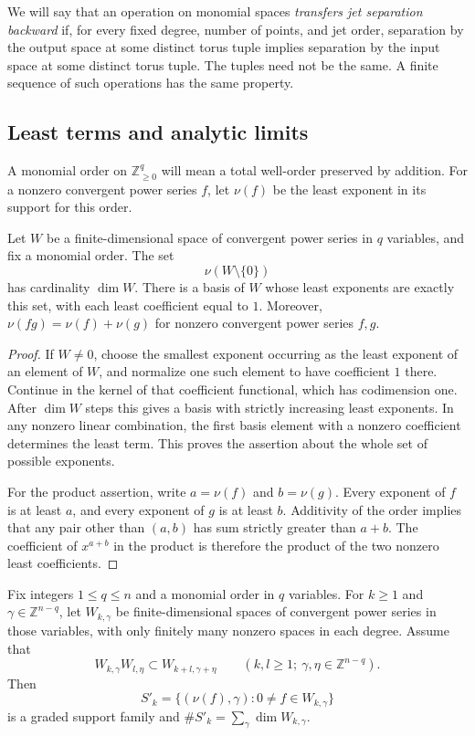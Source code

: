 We will say that an operation on monomial spaces \emph{transfers jet separation backward} if, for every fixed degree, number of points, and jet order, separation by the output space at some distinct torus tuple implies separation by the input space at some distinct torus tuple. The tuples need not be the same. A finite sequence of such operations has the same property.

\subsection{Least terms and analytic limits}

A monomial order on $\mathbb{Z}_{\geq0}^q$ will mean a total well-order preserved by addition. For a nonzero convergent power series $f$, let $\nu(f)$ be the least exponent in its support for this order.

\begin{lemma}\label{lem:least-terms}
Let $W$ be a finite-dimensional space of convergent power series in $q$ variables, and fix a monomial order. The set
\[
 \nu(W\setminus\{0\})
\]
has cardinality $\dim W$. There is a basis of $W$ whose least exponents are exactly this set, with each least coefficient equal to $1$. Moreover, $\nu(fg)=\nu(f)+\nu(g)$ for nonzero convergent power series $f,g$.
\end{lemma}

\begin{proof}
If $W\ne0$, choose the smallest exponent occurring as the least exponent of an element of $W$, and normalize one such element to have coefficient $1$ there. Continue in the kernel of that coefficient functional, which has codimension one. After $\dim W$ steps this gives a basis with strictly increasing least exponents. In any nonzero linear combination, the first basis element with a nonzero coefficient determines the least term. This proves the assertion about the whole set of possible exponents.

For the product assertion, write $a=\nu(f)$ and $b=\nu(g)$. Every exponent of $f$ is at least $a$, and every exponent of $g$ is at least $b$. Additivity of the order implies that any pair other than $(a,b)$ has sum strictly greater than $a+b$. The coefficient of $x^{a+b}$ in the product is therefore the product of the two nonzero least coefficients.
\end{proof}

\begin{lemma}\label{lem:row-valuation}
Fix integers $1\leq q\leq n$ and a monomial order in $q$ variables. For $k\geq1$ and $\gamma\in\mathbb{Z}^{n-q}$, let $W_{k,\gamma}$ be finite-dimensional spaces of convergent power series in those variables, with only finitely many nonzero spaces in each degree. Assume that
\[
 W_{k,\gamma}W_{l,\eta}\subset W_{k+l,\gamma+\eta}
 \qquad(k,l\geq1;\ \gamma,\eta\in\mathbb{Z}^{n-q}).
\]
Then
\[
 S'_k=\{(\nu(f),\gamma):0\ne f\in W_{k,\gamma}\}
\]
is a graded support family and $\#S'_k=\sum_\gamma\dim W_{k,\gamma}$.
\end{lemma}

